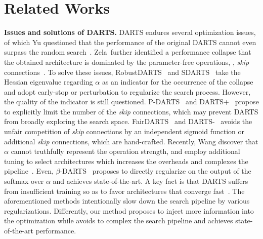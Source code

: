 \documentclass[10pt,twocolumn,letterpaper]{article}
\newcommand{\mypara}[1]{\vspace{1mm}\noindent\textbf{#1}}
\begin{document}
 \section{Related Works}
\label{sec:related}
\vspace{-4pt}
\mypara{Issues and solutions of DARTS.}
DARTS endures several optimization issues, of which Yu \etal questioned that the performance of the original DARTS cannot even surpass the random search~\cite{Yu2020Evaluating}.
Zela~\etal further identified a performance collapse that the obtained architecture is dominated by the parameter-free operations, \eg, \textit{skip} connections~\cite{Zela2020Understanding}.
To solve these issues, RobustDARTS~\cite{Zela2020Understanding} and SDARTS~\cite{chen_2020_sdarts} take the Hessian eigenvalue regarding $\alpha$ as an indicator for the occurrence of the collapse and adopt early-stop or perturbation to regularize the search process.
However, the quality of the indicator is still questioned.
P-DARTS~\cite{Chen_2019_pdarts} and DARTS+~\cite{liang2019darts+} propose to explicitly limit the number of the \textit{skip} connections, 
which may prevent DARTS from broadly exploring the search space.
FairDARTS~\cite{chu_2020_fairdarts} and DARTS-~\cite{chu2021dartsminus} avoids the unfair competition of \textit{skip} connections by an independent sigmoid function or additional \textit{skip} connections, which are hand-crafted.
Recently, Wang \etal discover that $\alpha$ cannot truthfully represent the operation strength,
and employ additional tuning to select architectures which increases the overheads and complexes the pipeline~\cite{wang_2021_rethinking}.
Even, $\beta$-DARTS~\cite{ye_2022_beta} proposes to directly regularize on the output of the softmax over $\alpha$ and achieves state-of-the-art.
A key fact is that DARTS suffers from insufficient training so as to favor architectures that converge fast~\cite{shu_2020_understanding}.
The aforementioned methods intentionally slow down the search pipeline by various regularizations.
Differently, our method proposes to inject more information into the optimization 
while avoids to complex the search pipeline and achieves state-of-the-art performance.
\end{document}
